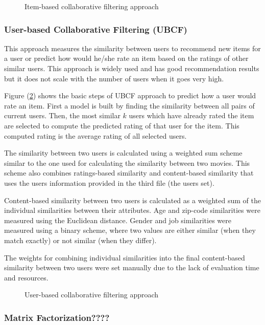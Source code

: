 \documentclass{sigish}
\begin{document}
\begin{figure}
	\centering
	\caption{Item-based collaborative filtering approach}
	\label{fig:ibcf_approach}
\end{figure}

\subsubsection{User-based Collaborative Filtering (UBCF)}

This approach measures the similarity between users to recommend new items for a user or predict how would he/she rate an item based on the ratings of other similar users. This approach is widely used and has good recommendation results but it does not scale with the number of users when it goes very high.

Figure (\ref{fig:ubcf_approach}) shows the basic steps of UBCF approach to predict how a user would rate an item. First a model is built by finding the similarity between all pairs of current users. Then, the most similar $ k $ users which have already rated the item are selected to compute the predicted rating of that user for the item. This computed rating is the average rating of all selected users.

The similarity between two users is calculated using a weighted sum scheme similar to the one used for calculating the similarity between two movies. This scheme also combines ratings-based similarity and content-based similarity that uses the users information provided in the third file (the users set).

Content-based similarity between two users is calculated as a weighted sum of the individual similarities between their attributes. Age and zip-code similarities were measured using the Euclidean distance. Gender and job similarities were measured using a binary scheme, where two values are either similar (when they match exactly) or not similar (when they differ).

The weights for combining individual similarities into the final content-based similarity between two users were set manually due to the lack of evaluation time and resources.

\begin{figure}
	\centering
	\caption{User-based collaborative filtering approach}
	\label{fig:ubcf_approach}
\end{figure}

\subsubsection{Matrix Factorization????}
\end{document}
